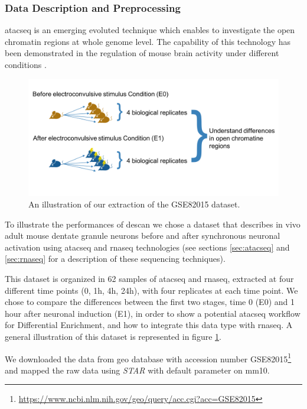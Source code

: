 \subsubsection{Data Description and Preprocessing}
\gls{atacseq} is an emerging evoluted technique which enables to investigate the open chromatin regions at whole genome level.
The capability of this technology has been demonstrated in the regulation of mouse brain activity under different conditions \cite{Su2017}.

\begin{figure}[H]
\centering
\includegraphics[width=12cm, keepaspectratio]{img/descan2/dataset.png}
\caption[DEScan2 dataset illustration]{An illustration of our extraction of the GSE82015\cite{Su2017} dataset.}
\label{fig:atacdataset}

\end{figure}

To illustrate the performances of \gls{descan} we chose a dataset \cite{Su2017} that describes in vivo adult mouse dentate granule neurons before and after synchronous neuronal activation using \gls{atacseq} and \gls{rnaseq} technologies (see sections \ref{sec:atacseq} and \ref{sec:rnaseq} for a description of these sequencing techniques).

This dataset is organized in 62 samples of \gls{atacseq} and \gls{rnaseq}, extracted at four different time points (0, 1h, 4h, 24h), with four replicates at each time point.
We chose to compare the differences between the first two stages, time 0 (E0) and 1 hour after neuronal induction (E1), in order to show a potential \gls{atacseq} workflow for Differential Enrichment, and how to integrate this data type with \gls{rnaseq}. A general illustration of this dataset is represented in figure \ref{fig:atacdataset}.


We downloaded the data from \gls{geo} database \cite{Edgar2002, Barrett2013} with accession number GSE82015\footnote{\url{https://www.ncbi.nlm.nih.gov/geo/query/acc.cgi?acc=GSE82015}} and mapped the raw data using \textit{STAR} \cite{Dobin2013} with default parameter on \gls{mm10}.

